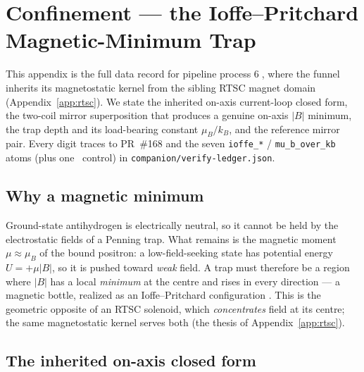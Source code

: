 \section{Confinement --- the Ioffe--Pritchard Magnetic-Minimum Trap}
\label{app:confinement}

This appendix is the full data record for pipeline process
\textcircled{\scriptsize 6}, where the funnel inherits its magnetostatic
kernel from the sibling RTSC magnet domain (Appendix~\ref{app:rtsc}). We
state the inherited on-axis current-loop closed form, the two-coil mirror
superposition that produces a genuine on-axis $|B|$ minimum, the trap depth
and its load-bearing constant $\mu_B/k_B$, and the reference mirror pair.
Every digit traces to PR~\#168 and the seven \texttt{ioffe\_*} /
\texttt{mu\_b\_over\_kb} atoms (plus one \tierRed\ control) in
\texttt{companion/verify-ledger.json}.

\subsection{Why a magnetic minimum}
\label{app:conf-why}

Ground-state antihydrogen is electrically neutral, so it cannot be held by
the electrostatic fields of a Penning trap. What remains is the magnetic
moment $\mu\approx\mu_B$ of the bound positron: a low-field-seeking state has
potential energy $U=+\mu|B|$, so it is pushed toward \emph{weak} field. A
trap must therefore be a region where $|B|$ has a local \emph{minimum} at the
centre and rises in every direction --- a magnetic bottle, realized as an
Ioffe--Pritchard configuration \citep{andresen2010trapped,amole2014alphatrap}.
This is the geometric opposite of an RTSC solenoid, which \emph{concentrates}
field at its centre; the same magnetostatic kernel serves both (the thesis of
Appendix~\ref{app:rtsc}).

\subsection{The inherited on-axis closed form}
\label{app:conf-loop}

